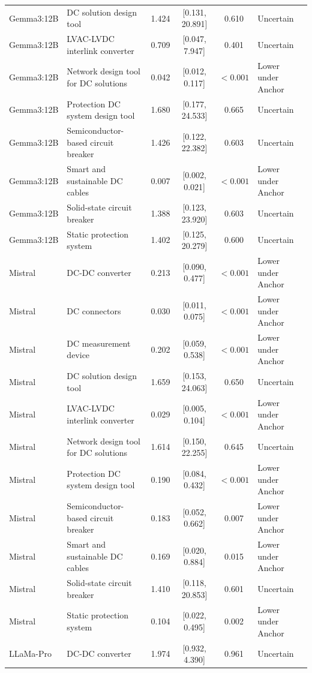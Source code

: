 \begin{longtable}[tbp]{p{2.2cm}p{5.0cm}cccp{3.2cm}}
Gemma3:12B & DC solution design tool & 1.424 & [0.131, 20.891] & 0.610 & Uncertain \\
Gemma3:12B & LVAC-LVDC interlink converter & 0.709 & [0.047, 7.947] & 0.401 & Uncertain \\
Gemma3:12B & Network design tool for DC solutions & 0.042 & [0.012, 0.117] & $<0.001$ & Lower under Anchor \\
Gemma3:12B & Protection DC system design tool & 1.680 & [0.177, 24.533] & 0.665 & Uncertain \\
Gemma3:12B & Semiconductor-based circuit breaker & 1.426 & [0.122, 22.382] & 0.603 & Uncertain \\
Gemma3:12B & Smart and sustainable DC cables & 0.007 & [0.002, 0.021] & $<0.001$ & Lower under Anchor \\
Gemma3:12B & Solid-state circuit breaker & 1.388 & [0.123, 23.920] & 0.603 & Uncertain \\
Gemma3:12B & Static protection system & 1.402 & [0.125, 20.279] & 0.600 & Uncertain \\
Mistral & DC-DC converter & 0.213 & [0.090, 0.477] & $<0.001$ & Lower under Anchor \\
Mistral & DC connectors & 0.030 & [0.011, 0.075] & $<0.001$ & Lower under Anchor \\
Mistral & DC measurement device & 0.202 & [0.059, 0.538] & $<0.001$ & Lower under Anchor \\
Mistral & DC solution design tool & 1.659 & [0.153, 24.063] & 0.650 & Uncertain \\
Mistral & LVAC-LVDC interlink converter & 0.029 & [0.005, 0.104] & $<0.001$ & Lower under Anchor \\
Mistral & Network design tool for DC solutions & 1.614 & [0.150, 22.255] & 0.645 & Uncertain \\
Mistral & Protection DC system design tool & 0.190 & [0.084, 0.432] & $<0.001$ & Lower under Anchor \\
Mistral & Semiconductor-based circuit breaker & 0.183 & [0.052, 0.662] & 0.007 & Lower under Anchor \\
Mistral & Smart and sustainable DC cables & 0.169 & [0.020, 0.884] & 0.015 & Lower under Anchor \\
Mistral & Solid-state circuit breaker & 1.410 & [0.118, 20.853] & 0.601 & Uncertain \\
Mistral & Static protection system & 0.104 & [0.022, 0.495] & 0.002 & Lower under Anchor \\
LLaMa-Pro & DC-DC converter & 1.974 & [0.932, 4.390] & 0.961 & Uncertain \\

\end{longtable}
